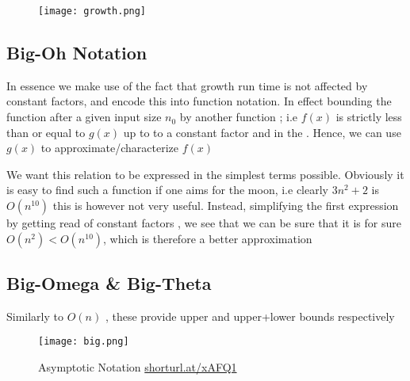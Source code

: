 
	
	\begin{figure}[H] 
\begin{center} 
\texttt{[image: growth.png]} 
\end{center} 
\end{figure}  

\subsection{Big-Oh Notation}




		\par{In essence we make use of the fact that growth run time is not affected by
				constant factors, and encode this into function notation. In effect
				bounding the function after a given input size $n_0$ by another
		function ; i.e $f(x)$ is strictly less than or equal to $g(x)$ up to to a
		constant factor and in the . Hence, we can use $g(x)$ to
		approximate/characterize $f(x)$}

		\par{We want this relation to be expressed in the simplest terms possible. Obviously it is easy to find such a function if one aims for the moon, i.e
				clearly $3n^2 + 2$ is $O(n^{10})$ this is however not very useful.
				Instead, simplifying the first expression by getting read of constant
				factors , we see that we can be sure that it is for sure $O(n^2) < O(n^{10})$,
		which is therefore a better approximation}



\subsection{Big-Omega \& Big-Theta}



		\par{Similarly to $O\left(n\right)$ , these provide upper and upper+lower bounds
		respectively}


		\begin{figure}[H] 
		\begin{center} 
				\texttt{[image: big.png]} 
		\caption{Asymptotic Notation
		\url{shorturl.at/xAFQ1}} 
		\end{center} 
		\end{figure}  
		
			
